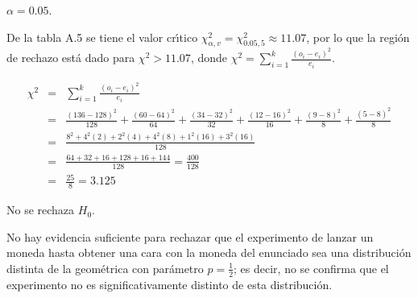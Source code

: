 \begin{solucion}
 \begin{significancia}
  $\alpha = 0.05$.
 \end{significancia}

 \begin{region}
  De la tabla A.5 se tiene el valor cr\'{\i}tico
  $\chi^2_{\alpha,v} = \chi^2_{0.05,5} \approx 11.07$,
  por lo que la regi\'on de rechazo est\'a dado
  para $\chi^2 > 11.07$, donde
  $\chi^2 = \sum_{i=1}^{k} \frac{\left( o_i - e_i \right)^2}{e_i}$.
 \end{region}

 \begin{estadistico}
  \begin{eqnarray*}
   \chi^2 & = & \sum_{i=1}^{k} \frac{\left( o_i - e_i \right)^2}{e_i} \\
   & = & \frac{(136-128)^2}{128} + \frac{(60-64)^2}{64} +
   \frac{(34-32)^2}{32} + \frac{(12-16)^2}{16} +
   \frac{(9-8)^2}{8} + \frac{(5-8)^2}{8} \\
   & = &
   \frac{8^2 + 4^2(2) + 2^2(4) + 4^2(8) + 1^2(16) + 3^2(16)}{128}\\
   & = & \frac{64 + 32 + 16 + 128 + 16 + 144}{128} = \frac{400}{128} \\
   & = & \frac{25}{8} = 3.125
  \end{eqnarray*}
 \end{estadistico}

 \begin{decision}
  No se rechaza $H_0$.
 \end{decision}

 \begin{conclusion}
  No hay evidencia suficiente para rechazar que el experimento
  de lanzar un moneda hasta obtener una cara con la moneda del enunciado
  sea una distribuci\'on distinta de la geom\'etrica
  con par\'ametro $p=\frac{1}{2}$;
  es decir, no se confirma que el experimento no es significativamente
  distinto de esta distribuci\'on.
 \end{conclusion}


\end{solucion}
